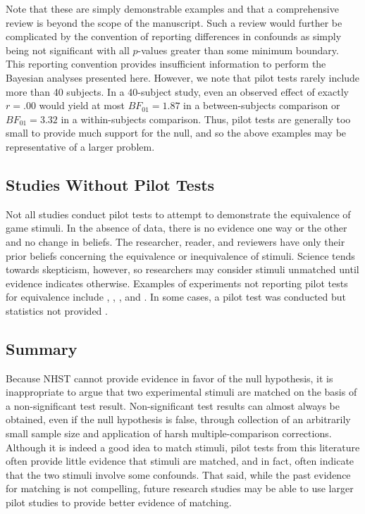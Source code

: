 \documentclass[man]{apa6}
\begin{document}
Note that these are simply demonstrable examples and that a comprehensive review is beyond the scope of the manuscript. Such a review would further be complicated by the convention of reporting differences in confounds as simply being not significant with all $p$-values greater than some minimum boundary. %
This reporting convention provides insufficient information to perform the Bayesian analyses presented here. 
However, we note that pilot tests rarely include more than 40 subjects. In a 40-subject study, even an observed effect of exactly $r = .00$ would yield at most $BF_{01} = 1.87$ in a between-subjects comparison or $BF_{01} = 3.32$ in a within-subjects comparison. Thus, pilot tests are generally too small to provide much support for the null, and so the above examples may be representative of a larger problem.

\subsection{Studies Without Pilot Tests}
Not all studies conduct pilot tests to attempt to demonstrate the equivalence of game stimuli. In the absence of data, there is no evidence one way or the other and no change in beliefs. The researcher, reader, and reviewers have only their prior beliefs concerning the equivalence or inequivalence of stimuli. Science tends towards skepticism, however, so researchers may consider stimuli unmatched until evidence indicates otherwise. Examples of experiments not reporting pilot tests for equivalence include \citet{Bartholow:Anderson:2002}, \citet{Bartholow:etal:2006}, \citet{Bartholow:etal:2005}, and \citet{Hasan:etal:2012}. In some cases, a pilot test was conducted but statistics not provided \citep[e.g.,][]{Engelhardt:etal:2011}. 

\subsection{Summary}
Because NHST cannot provide evidence in favor of the null hypothesis, it is inappropriate to argue that two experimental stimuli are matched on the basis of a non-significant test result.  Non-significant test results can almost always be obtained, even if the null hypothesis is false, through collection of an arbitrarily small sample size and application of harsh multiple-comparison corrections.  Although it is indeed a good idea to match stimuli, pilot tests from this literature often provide little evidence that stimuli are matched, and in fact, often indicate that the two stimuli involve some confounds. That said, while the past evidence for matching is not compelling, future research studies may be able to use larger pilot studies to provide better evidence of matching. 
 
\end{document}
